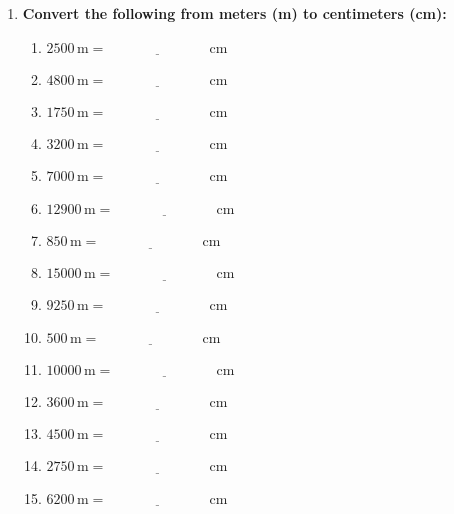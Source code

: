 \documentclass[12pt]{article}
\begin{document}
\begin{enumerate}
    \item \textbf{Convert the following from meters (m) to centimeters (cm):}
    \begin{multicols}{2}
    \begin{enumerate}
        \item \(2500 \, \text{m} = \underline{\hspace{3cm}} \, \text{cm}\)
        \item \(4800 \, \text{m} = \underline{\hspace{3cm}} \, \text{cm}\)
        \item \(1750 \, \text{m} = \underline{\hspace{3cm}} \, \text{cm}\)
        \item \(3200 \, \text{m} = \underline{\hspace{3cm}} \, \text{cm}\)
        \item \(7000 \, \text{m} = \underline{\hspace{3cm}} \, \text{cm}\)
        \item \(12900 \, \text{m} = \underline{\hspace{3cm}} \, \text{cm}\)
        \item \(850 \, \text{m} = \underline{\hspace{3cm}} \, \text{cm}\)
        \item \(15000 \, \text{m} = \underline{\hspace{3cm}} \, \text{cm}\)
        \item \(9250 \, \text{m} = \underline{\hspace{3cm}} \, \text{cm}\)
        \item \(500 \, \text{m} = \underline{\hspace{3cm}} \, \text{cm}\)
        \item \(10000 \, \text{m} = \underline{\hspace{3cm}} \, \text{cm}\)
        \item \(3600 \, \text{m} = \underline{\hspace{3cm}} \, \text{cm}\)
        \item \(4500 \, \text{m} = \underline{\hspace{3cm}} \, \text{cm}\)
        \item \(2750 \, \text{m} = \underline{\hspace{3cm}} \, \text{cm}\)
        \item \(6200 \, \text{m} = \underline{\hspace{3cm}} \, \text{cm}\)
    \end{enumerate}
    \end{multicols}


\end{enumerate}
\end{document}
